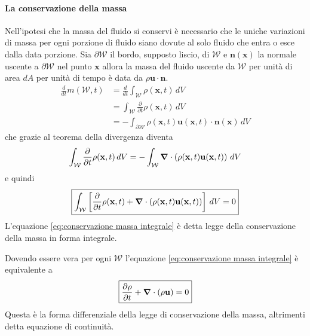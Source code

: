 \paragraph{La conservazione della massa}
Nell'ipotesi che la massa del fluido si conservi è necessario che le uniche variazioni di massa per ogni porzione di fluido siano dovute al solo fluido che entra o esce dalla data porzione. Sia $\partial \mathcal{W}$ il bordo, supposto liscio, di  $\mathcal{W}$ e $\mathbf{n}(\mathbf{x})$ la normale uscente a $\partial \mathcal{W}$ nel punto $\mathbf{x}$ allora la massa del fluido uscente da $\mathcal{W}$ per unità di area $dA$ per unità di tempo è data da $\rho \mathbf{u}\cdot \mathbf{n}$.
\begin{equation*}  
\begin{split}
\frac{d}{dt} m(\mathcal{W},t) &= \frac{d}{dt}  \int_{\mathcal{W}}\rho(\mathbf{x},t) \, dV \\
                              &= \int_{\mathcal{W}}\frac{\partial}{\partial t}\rho(\mathbf{x},t) \, dV \\
                              &= - \int_{\partial \mathcal{W}}\rho(\mathbf{x},t) \mathbf{u}(\mathbf{x},t) \cdot \mathbf{n}(\mathbf{x}) \, dV
\end{split}
\end{equation*}
che grazie al teorema della divergenza diventa
\begin{equation*}
\int_{\mathcal{W}}\frac{\partial}{\partial t}\rho(\mathbf{x},t) \, dV = -\int_{\mathcal{W}}\boldsymbol{\nabla} \cdot \left (\rho(\mathbf{x},t) \mathbf{u}(\mathbf{x},t) \right ) \, dV
\end{equation*}
e quindi
\begin{equation}\label{eq:conservazione massa integrale}
\boxed{
\int_{\mathcal{W}}\left [ \frac{\partial}{\partial t}\rho(\mathbf{x},t) + \boldsymbol{\nabla} \cdot (\rho(\mathbf{x},t) \mathbf{u}(\mathbf{x},t)) \right ]\, dV = 0
}
\end{equation}
L'equazione \ref{eq:conservazione massa integrale} è detta legge della conservazione della massa in forma integrale.

Dovendo essere vera per ogni $\mathcal{W}$ l'equazione \ref{eq:conservazione massa integrale} è equivalente a 
\begin{equation}\label{eq:conservazione massa differenziale}
\boxed{
\frac{\partial \rho}{\partial t} + \boldsymbol{\nabla} \cdot (\rho \mathbf{u}) = 0
}
\end{equation}
Questa è la forma differenziale della legge di conservazione della massa, altrimenti detta equazione di continuità.


